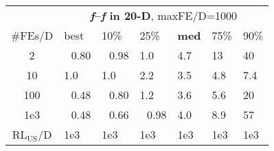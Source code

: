 \begin{tabular}{c|llllll}
 & \multicolumn{6}{|c}{\textbf{\textit{f}\raisebox{-0.35ex}{1}--\textit{f}\raisebox{-0.35ex}{24} in 20-D}, maxFE/D=1000}\\
\#FEs/D & best & 10\% & 25\% & \textbf{med} & 75\% & 90\%\\
2 & ~\,0.80 & ~\,0.98 & \hspace*{1ex}1.0 & \hspace*{1ex}4.7 & 13 & 40\\
10 & \hspace*{1ex}1.0 & \hspace*{1ex}1.0 & \hspace*{1ex}2.2 & \hspace*{1ex}3.5 & \hspace*{1ex}4.8 & \hspace*{1ex}7.4\\
100 & ~\,0.48 & ~\,0.80 & \hspace*{1ex}1.2 & \hspace*{1ex}3.6 & \hspace*{1ex}5.6 & 20\\
1e3 & ~\,0.48 & ~\,0.66 & ~\,0.98 & \hspace*{1ex}4.0 & \hspace*{1ex}8.9 & 57\\
$\text{RL}_{\text{US}}$/D & 1e3 & 1e3 & 1e3 & 1e3 & 1e3 & 1e3
\end{tabular}
